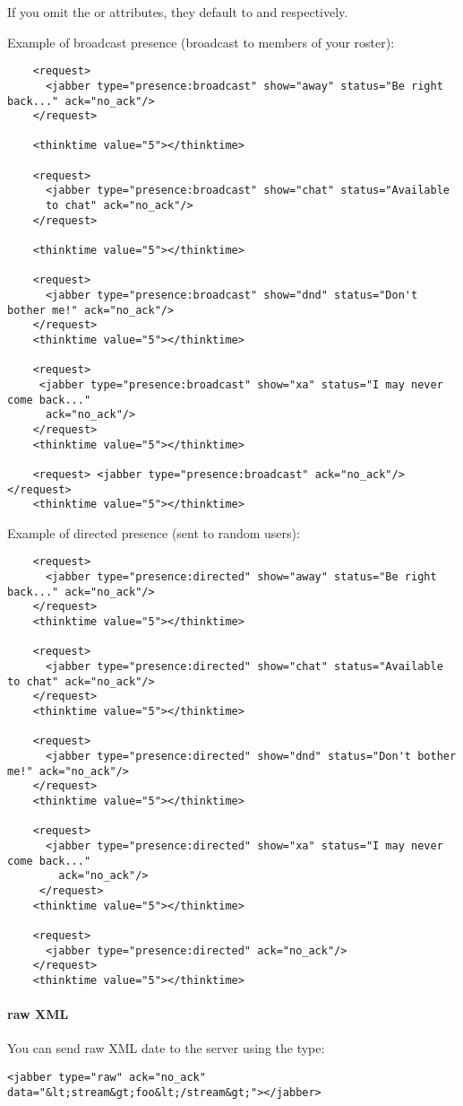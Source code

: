 \documentclass{IDXDOC-en}
\begin{document}
If you omit the  or  attributes, they default to  and  respectively.

Example of broadcast presence (broadcast to members of your roster):
\begin{Verbatim}
    <request>
      <jabber type="presence:broadcast" show="away" status="Be right back..." ack="no_ack"/>
    </request>

    <thinktime value="5"></thinktime>

    <request>
      <jabber type="presence:broadcast" show="chat" status="Available
      to chat" ack="no_ack"/>
    </request>

    <thinktime value="5"></thinktime>

    <request>
      <jabber type="presence:broadcast" show="dnd" status="Don't bother me!" ack="no_ack"/>
    </request>
    <thinktime value="5"></thinktime>

    <request>
     <jabber type="presence:broadcast" show="xa" status="I may never come back..."
      ack="no_ack"/>
    </request>
    <thinktime value="5"></thinktime>

    <request> <jabber type="presence:broadcast" ack="no_ack"/> </request>
    <thinktime value="5"></thinktime>
\end{Verbatim}

Example of directed presence (sent to random  users):
\begin{Verbatim}
    <request>
      <jabber type="presence:directed" show="away" status="Be right back..." ack="no_ack"/>
    </request>
    <thinktime value="5"></thinktime>

    <request>
      <jabber type="presence:directed" show="chat" status="Available to chat" ack="no_ack"/>
    </request>
    <thinktime value="5"></thinktime>

    <request>
      <jabber type="presence:directed" show="dnd" status="Don't bother me!" ack="no_ack"/>
    </request>
    <thinktime value="5"></thinktime>

    <request>
      <jabber type="presence:directed" show="xa" status="I may never come back..."
        ack="no_ack"/>
     </request>
    <thinktime value="5"></thinktime>

    <request>
      <jabber type="presence:directed" ack="no_ack"/>
    </request>
    <thinktime value="5"></thinktime>
\end{Verbatim}

\paragraph{raw XML}
You can send raw XML date to the server using the  type:
\begin{Verbatim}
<jabber type="raw" ack="no_ack" data="&lt;stream&gt;foo&lt;/stream&gt;"></jabber>
\end{Verbatim}
\end{document}
